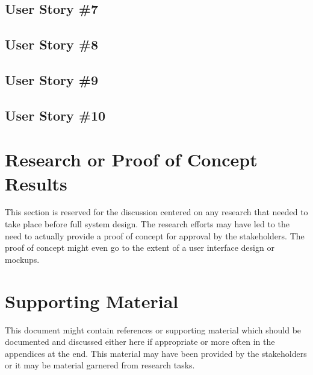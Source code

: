 \subsection{User Story \#7} 
\subsection{User Story \#8} 
\subsection{User Story \#9}
\subsection{User Story \#10}  

\section{Research or Proof of Concept Results}
This section is reserved for the discussion centered on any research that needed 
to take place before full system design.  The research efforts may have led to 
the need to actually provide a proof of concept for approval by the stakeholders. 
 The proof of concept might even go to the extent of a user interface design or 
mockups. 


\section{Supporting Material}


This document might contain references or supporting material which should be documented 
and discussed  either here if appropriate or more often in the appendices at the end.  This material may have been provided by the stakeholders  
or it may be material garnered from research tasks.

